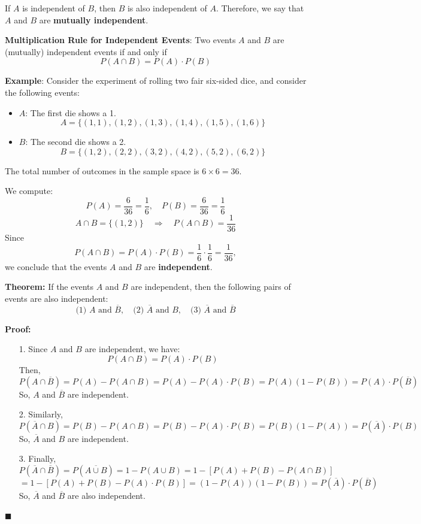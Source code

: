 \documentclass[twoside]{book}
\begin{document}
\begin{textbox}
If \( A \) is independent of \( B \), then \( B \) is also independent of \( A \). Therefore, we say that \( A \) and \( B \) are \textbf{mutually independent}.
\end{textbox}

\begin{textbox}
\textbf{Multiplication Rule for Independent Events}: Two events $A$ and $B$ are (mutually) independent events if and only if
$$P( A \cap B ) = P( A ) \cdot P( B )$$
\end{textbox}

\textbf{Example}: Consider the experiment of rolling two fair six-sided dice, and consider the following events:
\begin{itemize}
    \item \( A \): The first die shows a 1.
    \[ A = \{(1,1), (1,2), (1,3), (1,4), (1,5), (1,6)\} \]
    \item \( B \): The second die shows a 2.
    \[ B = \{(1,2), (2,2), (3,2), (4,2), (5,2), (6,2)\} \]
\end{itemize}

The total number of outcomes in the sample space is \( 6 \times 6 = 36 \).

We compute:
\[
P(A) = \frac{6}{36} = \frac{1}{6}, \quad P(B) = \frac{6}{36} = \frac{1}{6}
\]
\[
A \cap B = \{(1,2)\} \quad \Rightarrow \quad P(A \cap B) = \frac{1}{36}
\]
Since
\[
P(A \cap B) = P(A) \cdot P(B) = \frac{1}{6} \cdot \frac{1}{6} = \frac{1}{36},
\]
we conclude that the events \( A \) and \( B \) are \textbf{independent}.

\begin{textbox}
\textbf{Theorem:}
If the events \( A \) and \( B \) are independent, then the following pairs of events are also independent:
\[
\text{(1) } A \text{ and } \overline{B}, \quad \text{(2) } \overline{A} \text{ and } B, \quad \text{(3) } \overline{A} \text{ and } \overline{B}
\]
\end{textbox}
\textbf{Proof:}

\begin{itemize}
  \item[1.] Since \( A \) and \( B \) are independent, we have:
  \[
  P(A \cap B) = P(A)\cdot P(B)
  \]
  Then,
  \[
  P(A \cap \overline{B}) = P(A) - P(A \cap B) = P(A) - P(A)\cdot P(B) = P(A)(1 - P(B)) = P(A)\cdot P(\overline{B})
  \]
  So, \( A \) and \( \overline{B} \) are independent.

  \item[2.] Similarly,
  \[
  P(\overline{A} \cap B)  = P(B) - P(A \cap B) = P(B) - P(A)\cdot P(B) = P(B)(1 - P(A)) = P(\overline{A})\cdot P(B)
  \]
  So, \( \overline{A} \) and \( B \) are independent.

  \item[3.] Finally,
  \[
  P(\overline{A} \cap \overline{B}) = P(\overline{A \cup B}) = 1 - P(A \cup B) = 1 - [P(A) + P(B) - P(A \cap B)]
  \]
  \[
  = 1 - [P(A) + P(B) - P(A)\cdot P(B)] = (1 - P(A))(1 - P(B)) = P(\overline{A})\cdot P(\overline{B})
  \]
  So, \( \overline{A} \) and \( \overline{B} \) are also independent.
\end{itemize}
\hfill\(\blacksquare\)
\end{document}

